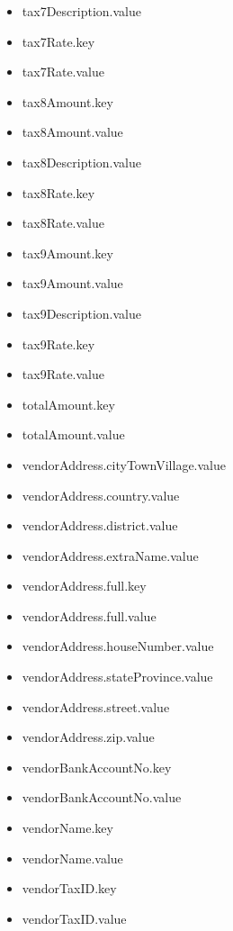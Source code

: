 \begin{multicols}{2}
\begin{itemize}
		\item[] tax7Description.value
		\item[] tax7Rate.key
		\item[] tax7Rate.value
		\item[] tax8Amount.key
		\item[] tax8Amount.value
		\item[] tax8Description.value
		\item[] tax8Rate.key
		\item[] tax8Rate.value
		\item[] tax9Amount.key
		\item[] tax9Amount.value
		\item[] tax9Description.value
		\item[] tax9Rate.key
		\item[] tax9Rate.value
		\item[] totalAmount.key
		\item[] totalAmount.value
		\item[] vendorAddress.cityTownVillage.value
		\item[] vendorAddress.country.value
		\item[] vendorAddress.district.value
		\item[] vendorAddress.extraName.value
		\item[] vendorAddress.full.key
		\item[] vendorAddress.full.value
		\item[] vendorAddress.houseNumber.value
		\item[] vendorAddress.stateProvince.value
		\item[] vendorAddress.street.value
		\item[] vendorAddress.zip.value
		\item[] vendorBankAccountNo.key
		\item[] vendorBankAccountNo.value
		\item[] vendorName.key
		\item[] vendorName.value
		\item[] vendorTaxID.key
		\item[] vendorTaxID.value
\end{itemize}
\end{multicols}
\cleardoublepage



